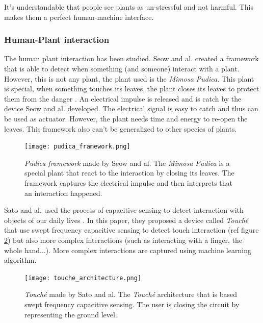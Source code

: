 It's understandable that people see plants as un-stressful and not harmful. This makes them a perfect human-machine interface.

\subsubsection{Human-Plant interaction}

The human plant interaction has been studied. Seow and al. \cite{seowPudicaFrameworkDesigning2022}
created a framework that is able to detect when something (and someone) interact with a plant.
However, this is not any plant, the plant used is the \textit{Mimosa Pudica}. This plant is special,
when something touches its leaves, the plant closes its leaves to protect them from the danger \cite{volkovMimosaPudicaElectrical2010}. 
An electrical impulse is released and is catch by the device Seow and al. developed. The electrical 
signal is easy to catch and thus can be used as actuator. However, the plant needs time and energy
to re-open the leaves. This framework also can't be generalized to other species of plants.

\begin{figure}[h!]
    \centering
    \texttt{[image: pudica\_framework.png]}
    \caption{\textit{Pudica framework} made by Seow and al. The \textit{Mimosa Pudica} is a
    special plant that react to the interaction by closing its leaves. The framework captures the electrical impulse and then interprets that an interaction happened.} 
    \vspace{0.1cm}
    \label{fig:pudica_framework}
\end{figure}

Sato and al. used the process of capacitive sensing to detect interaction with objects of our daily lives \cite{satoToucheEnhancingTouch2012}.
In this paper, they proposed a device called \textit{Touché} that use swept frequency capacitive sensing to detect touch interaction (ref figure \ref{fig:touche_architecture}) but also more complex interactions (such as interacting with a finger, the whole hand...). More complex interactions are captured using machine learning algorithm.

\begin{figure}[h!]
    \centering
    \texttt{[image: touche\_architecture.png]}
    \caption{\textit{Touché} made by Sato and al. The \textit{Touché} architecture that is based swept frequency capacitive sensing. The user is closing the circuit by representing the ground level.} 
    \vspace{0.1cm}
    \label{fig:touche_architecture}
\end{figure}


